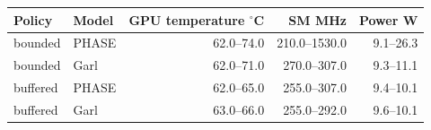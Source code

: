 \begin{tabular}{llrrr}
\toprule
Policy & Model & GPU temperature $^\circ$C & SM MHz & Power W \\
\midrule
bounded & PHASE & 62.0--74.0 & 210.0--1530.0 & 9.1--26.3 \\
bounded & Garl & 62.0--71.0 & 270.0--307.0 & 9.3--11.1 \\
buffered & PHASE & 62.0--65.0 & 255.0--307.0 & 9.4--10.1 \\
buffered & Garl & 63.0--66.0 & 255.0--292.0 & 9.6--10.1 \\
\bottomrule
\end{tabular}
